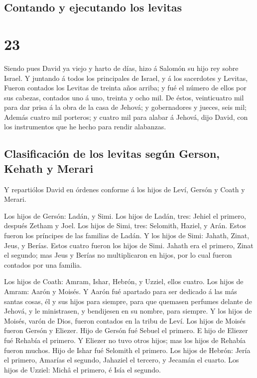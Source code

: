 \hypertarget{contando-y-ejecutando-los-levitas}{%
\subsection{Contando y ejecutando los
levitas}\label{contando-y-ejecutando-los-levitas}}

\hypertarget{section-22}{%
\section{23}\label{section-22}}

 Siendo pues David ya viejo y harto de días, hizo á
Salomón su hijo rey sobre Israel.  Y juntando á todos los
principales de Israel, y á los sacerdotes y Levitas, 
Fueron contados los Levitas de treinta años arriba; y fué el número de
ellos por sus cabezas, contados uno á uno, treinta y ocho mil.
 De éstos, veinticuatro mil para dar prisa á la obra de la
casa de Jehová; y gobernadores y jueces, seis mil;  Además
cuatro mil porteros; y cuatro mil para alabar á Jehová, dijo David, con
los instrumentos que he hecho para rendir alabanzas.

\hypertarget{clasificaciuxf3n-de-los-levitas-seguxfan-gerson-kehath-y-merari}{%
\subsection{Clasificación de los levitas según Gerson, Kehath y
Merari}\label{clasificaciuxf3n-de-los-levitas-seguxfan-gerson-kehath-y-merari}}

 Y repartiólos David en órdenes conforme á los hijos de
Leví, Gersón y Coath y Merari.

 Los hijos de Gersón: Ladán, y Simi.  Los
hijos de Ladán, tres: Jehiel el primero, después Zetham y Joel.
 Los hijos de Simi, tres: Selomith, Haziel, y Arán. Estos
fueron los príncipes de las familias de Ladán.  Y los
hijos de Simi: Jahath, Zinat, Jeus, y Berías. Estos cuatro fueron los
hijos de Simi.  Jahath era el primero, Zinat el segundo;
mas Jeus y Berías no multiplicaron en hijos, por lo cual fueron contados
por una familia.

 Los hijos de Coath: Amram, Ishar, Hebrón, y Uzziel,
ellos cuatro.  Los hijos de Amram: Aarón y Moisés. Y
Aarón fué apartado para ser dedicado á las más santas cosas, él y sus
hijos para siempre, para que quemasen perfumes delante de Jehová, y le
ministrasen, y bendijesen en su nombre, para siempre.  Y
los hijos de Moisés, varón de Dios, fueron contados en la tribu de Leví.
 Los hijos de Moisés fueron Gersón y Eliezer.
 Hijo de Gersón fué Sebuel el primero.  E
hijo de Eliezer fué Rehabía el primero. Y Eliezer no tuvo otros hijos;
mas los hijos de Rehabía fueron muchos.  Hijo de Ishar
fué Selomith el primero.  Los hijos de Hebrón: Jería el
primero, Amarías el segundo, Jahaziel el tercero, y Jecamán el cuarto.
 Los hijos de Uzziel: Michâ el primero, é Isía el
segundo.

